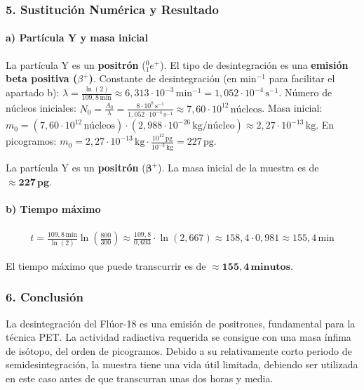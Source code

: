\subsubsection*{5. Sustitución Numérica y Resultado}
\paragraph{a) Partícula Y y masa inicial}
La partícula Y es un \textbf{positrón} (${}_{1}^{0}e^+$). El tipo de desintegración es una \textbf{emisión beta positiva ($\beta^+$)}.
Constante de desintegración (en min$^{-1}$ para facilitar el apartado b):
$\lambda = \frac{\ln(2)}{109,8\,\text{min}} \approx 6,313\cdot10^{-3}\,\text{min}^{-1} = 1,052\cdot10^{-4}\,\text{s}^{-1}$.
Número de núcleos iniciales:
$N_0 = \frac{A_0}{\lambda} = \frac{8\cdot10^8\,\text{s}^{-1}}{1,052\cdot10^{-4}\,\text{s}^{-1}} \approx 7,60\cdot10^{12}\,\text{núcleos}$.
Masa inicial:
$m_0 = (7,60\cdot10^{12}\,\text{núcleos}) \cdot (2,988\cdot10^{-26}\,\text{kg/núcleo}) \approx 2,27\cdot10^{-13}\,\text{kg}$.
En picogramos: $m_0 = 2,27\cdot10^{-13}\,\text{kg} \cdot \frac{10^{12}\,\text{pg}}{10^{-3}\,\text{kg}} = 227\,\text{pg}$.
\begin{cajaresultado}
La partícula Y es un \textbf{positrón} ($\boldsymbol{\beta^+}$). La masa inicial de la muestra es de $\boldsymbol{\approx 227\,\textbf{pg}}$.
\end{cajaresultado}

\paragraph{b) Tiempo máximo}
\begin{gather}
    t = \frac{109,8\,\text{min}}{\ln(2)}\ln\left(\frac{800}{300}\right) \approx \frac{109,8}{0,693} \cdot \ln(2,667) \approx 158,4 \cdot 0,981 \approx 155,4\,\text{min}
\end{gather}
\begin{cajaresultado}
El tiempo máximo que puede transcurrir es de $\boldsymbol{\approx 155,4\,\textbf{minutos}}$.
\end{cajaresultado}

\subsubsection*{6. Conclusión}
\begin{cajaconclusion}
La desintegración del Flúor-18 es una emisión de positrones, fundamental para la técnica PET. La actividad radiactiva requerida se consigue con una masa ínfima de isótopo, del orden de picogramos. Debido a su relativamente corto periodo de semidesintegración, la muestra tiene una vida útil limitada, debiendo ser utilizada en este caso antes de que transcurran unas dos horas y media.
\end{cajaconclusion}

